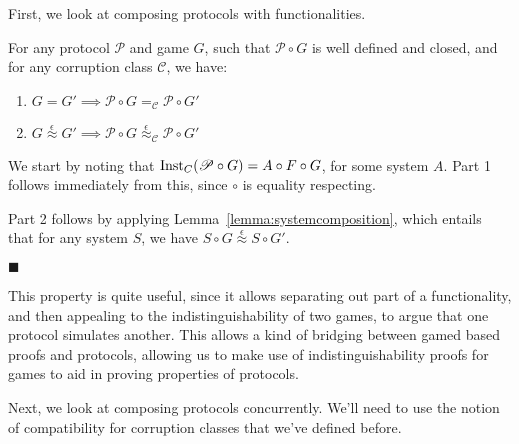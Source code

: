 First, we look at composing protocols with functionalities.

\begin{theorem}
  \label{thm:vertical_composition_theorem}
  For any protocol $\mathscr{P}$ and game $G$, such that $\mathscr{P} \circ G$
  is well defined and closed, and for any corruption class $\mathscr{C}$, we have:
  \begin{enumerate}
    \item $G = G' \implies \mathscr{P} \circ G =_{\mathscr{C}} \mathscr{P} \circ G'$
    \item $G \overset{\epsilon}{\approx} G' \implies \mathscr{P} \circ G \overset{\epsilon}{\approx}_{\mathscr{C}} \mathscr{P} \circ G'$
  \end{enumerate}
  
 We start by noting that $\text{Inst}_C(\mathscr{P} \circ G) = A \circ F \circ G$,
for some system $A$.
Part 1 follows immediately from this, since $\circ$ is equality respecting.

Part 2 follows by applying Lemma~\ref{lemma:systemcomposition},
which entails that for any system $S$, we have $S \circ G \overset{\epsilon}{\approx} S \circ G'$.

$\blacksquare$
\end{theorem}

This property is quite useful, since it allows separating out part
of a functionality, and then appealing to the indistinguishability
of two games, to argue that one protocol simulates another.
This allows a kind of bridging between gamed based proofs
and protocols, allowing us to make
use of indistinguishability proofs for games to aid
in proving properties of protocols.

Next, we look at composing protocols concurrently.
We'll need to use the notion of compatibility for corruption
classes that we've defined before.

